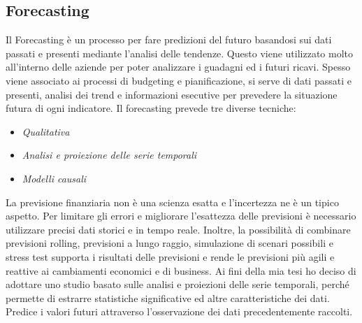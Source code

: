 \subsection{Forecasting}
Il Forecasting è un processo per fare predizioni del futuro basandosi sui dati passati e presenti mediante l'analisi delle tendenze. Questo viene utilizzato molto all'interno delle aziende per poter analizzare i guadagni ed i futuri ricavi. \cite{Forecasting}
Spesso viene associato ai processi di budgeting e pianificazione, si serve di dati passati e presenti, analisi dei trend e informazioni esecutive per prevedere la situazione futura di ogni  indicatore.
Il forecasting prevede tre diverse tecniche:
\begin{itemize}
\item \textit{Qualitativa}
\item \textit{Analisi e proiezione delle serie temporali}
\item \textit{Modelli causali}
\end{itemize}
La previsione finanziaria non è una scienza esatta e l'incertezza ne è un tipico aspetto. Per limitare gli errori e migliorare l'esattezza delle previsioni è necessario utilizzare precisi dati storici e in tempo reale. Inoltre, la possibilità di combinare previsioni rolling, previsioni a lungo raggio, simulazione di scenari possibili e stress test supporta i risultati delle previsioni e rende le previsioni più agili e reattive ai cambiamenti economici e di business.
Ai fini della mia tesi ho deciso di adottare uno studio basato sulle analisi e proiezioni delle serie temporali, perché permette di estrarre statistiche significative ed altre caratteristiche dei dati. Predice i valori futuri attraverso l'osservazione dei dati precedentemente raccolti.




